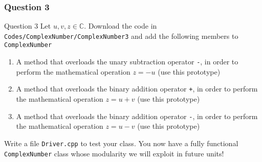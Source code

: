 \documentclass[8pt, compress]{beamer}
\def\inline{\lstinline[basicstyle=\ttfamily,keywordstyle={},directivestyle={}]}
\begin{document}
\begin{frame}[fragile]
  \frametitle{Question 3}
  \vspace{-2em}
  \begin{alertblock}{Question 3}
  Let $u,v,z \in \mathbb{C}$. Download the code in
  \inline|Codes/ComplexNumber/ComplexNumber3| and add the following members to
  \inline|ComplexNumber|
  
  \begin{enumerate}
    \item A method that overloads the unary subtraction operator \inline|-|, in
      order to perform the mathematical operation $z=-u$ (use this prototype)
       

    \item A method that overloads the binary addition operator \inline|+|, in
      order to perform the mathematical operation $z=u+v$ (use this prototype)
       

    \item A method that overloads the binary addition operator \inline|-|, in
      order to perform the mathematical operation $z=u-v$ (use this prototype)
       
  \end{enumerate}

  Write a file \inline|Driver.cpp| to test your class. You now have a fully
  functional \inline|ComplexNumber| class whose modularity we will exploit in future
  units!

  \end{alertblock}
\end{frame}
\end{document}
